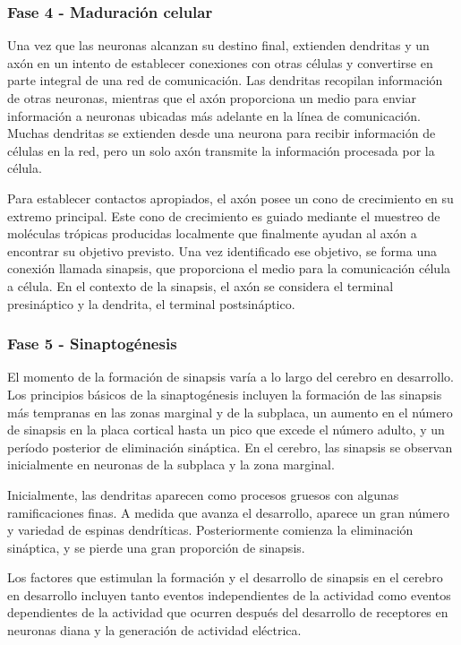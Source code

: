 \documentclass[11pt,letterpaper]{report}
\begin{document}
\subsubsection{Fase 4 - Maduración celular}
Una vez que las neuronas alcanzan su destino final, extienden dendritas y un
axón en un intento de establecer conexiones con otras células y convertirse en
parte integral de una red de comunicación. Las dendritas recopilan información
de otras neuronas, mientras que el axón proporciona un medio para enviar
información a neuronas ubicadas más adelante en la línea de comunicación.
Muchas dendritas se extienden desde una neurona para recibir información de
células en la red, pero un solo axón transmite la información procesada por la
célula. \cite{Gibb2018}

Para establecer contactos apropiados, el axón posee un cono de crecimiento en
su extremo principal. Este cono de crecimiento es guiado mediante el muestreo
de moléculas trópicas producidas localmente que finalmente ayudan al axón a
encontrar su objetivo previsto. Una vez identificado ese objetivo, se forma una
conexión llamada sinapsis, que proporciona el medio para la comunicación célula
a célula. En el contexto de la sinapsis, el axón se considera el terminal
presináptico y la dendrita, el terminal postsináptico. \cite{Gibb2018}

\subsubsection{Fase 5 - Sinaptogénesis}
El momento de la formación de sinapsis varía a lo largo del cerebro en
desarrollo. Los principios básicos de la sinaptogénesis incluyen la formación
de las sinapsis más tempranas en las zonas marginal y de la subplaca, un
aumento en el número de sinapsis en la placa cortical hasta un pico que excede
el número adulto, y un período posterior de eliminación sináptica. En el
cerebro, las sinapsis se observan inicialmente en neuronas de la subplaca y la
zona marginal. \cite{Polin124}

Inicialmente, las dendritas aparecen como procesos gruesos con algunas 
ramificaciones finas. A medida que avanza el desarrollo, aparece un gran número
y variedad de espinas dendríticas. Posteriormente comienza la eliminación
sináptica, y se pierde una gran proporción de sinapsis. \cite{Polin124}

Los factores que estimulan la formación y el desarrollo de sinapsis en el
cerebro en desarrollo incluyen tanto eventos independientes de la actividad
como eventos dependientes de la actividad que ocurren después del desarrollo de
receptores en neuronas diana y la generación de actividad eléctrica.
\cite{Polin124}
\end{document}
